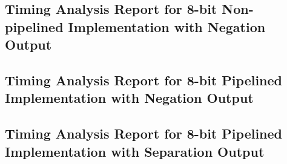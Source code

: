 \subsection{Timing Analysis Report for 8-bit Non-pipelined Implementation with Negation Output}
\label{sec:ap_7}

{
	\footnotesize{
		
	}
}

\subsection{Timing Analysis Report for 8-bit Pipelined Implementation with Negation Output}
\label{sec:ap_8}

{
	\footnotesize{
		
	}
}

\subsection{Timing Analysis Report for 8-bit Pipelined Implementation with Separation Output}
\label{sec:ap_9}

{
	\footnotesize{
		
	}
}